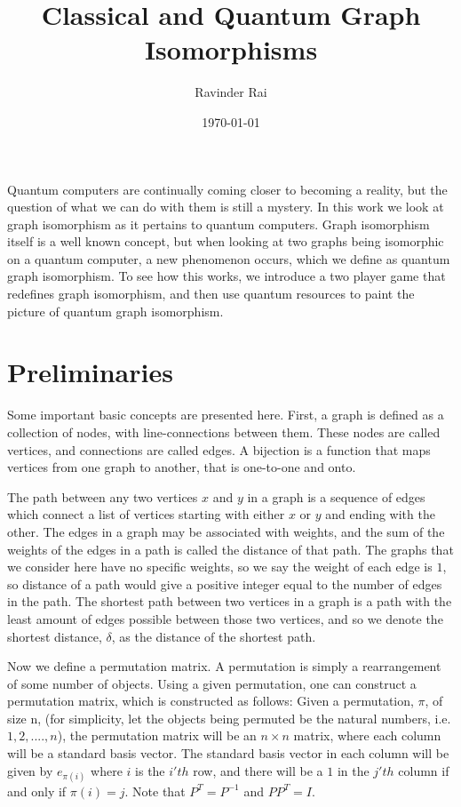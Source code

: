 \documentclass[12pt]{article}
\title{\textbf{Classical and Quantum Graph Isomorphisms}}
\author{Ravinder Rai}
\date{\today}
\theoremstyle{definition}
\theoremstyle{proposition}
\theoremstyle{lemma}
\begin{document}
 



\begin{titlepage}
\centering
\maketitle

Quantum computers are continually coming closer to becoming a reality, but the question of what we can do with them is still a mystery. In this work we look at graph isomorphism as it pertains to quantum computers. Graph isomorphism itself is a well known concept, but when looking at two graphs being isomorphic on a quantum computer, a new phenomenon occurs, which we define as quantum graph isomorphism. To see how this works, we introduce a two player game that redefines graph isomorphism, and then use quantum resources to paint the picture of quantum graph isomorphism. 

\end{titlepage}

\newpage
\section{Preliminaries}
Some important basic concepts are presented here. First, a graph is defined as a collection of nodes, with line-connections between them. These nodes are called vertices, and connections are called edges. A bijection is a function that maps vertices from one graph to another, that is one-to-one and onto.

The path between any two vertices $x$ and $y$ in a graph is a sequence of edges which connect a list of vertices starting with either $x$ or $y$ and ending with the other. The edges in a graph may be associated with weights, and the sum of the weights of the edges in a path is called the distance of that path. The graphs that we consider here have no specific weights, so we say the weight of each edge is $1$, so distance of a path would give a positive integer equal to the number of edges in the path. The shortest path between two vertices in a graph is a path with the least amount of edges possible between those two vertices, and so we denote the shortest distance, $\delta$, as the distance of the shortest path. 


Now we define a permutation matrix. A permutation is simply a rearrangement of some number of objects. Using a given permutation, one can construct a permutation matrix, which is constructed as follows: Given a permutation, $\pi$, of size n, (for simplicity, let the objects being permuted be the natural numbers, i.e. $1, 2, ...., n$), the permutation matrix will be an $n \times n$ matrix, where each column will be a standard basis vector. The standard basis vector in each column will be given by $e_{\pi(i)}$ where $i$ is the $i'th$ row, and there will be a $1$ in the $j'th$ column if and only if $\pi(i) = j$. Note that $P^T = P^{-1}$ and $PP^T = I$. 
\end{document}
